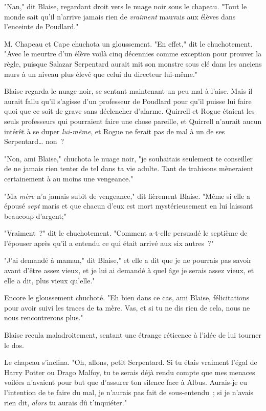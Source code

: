 "Nan," dit Blaise, regardant droit vers le nuage noir sous le chapeau. "Tout le monde sait qu'il n'arrive jamais rien de \emph{vraiment} mauvais aux élèves dans l'enceinte de Poudlard."

M. Chapeau et Cape chuchota un gloussement. "En effet," dit le chuchotement. "Avec le meurtre d'un élève voilà cinq décennies comme exception pour prouver la règle, puisque Salazar Serpentard aurait mit son monstre sous clé dans les anciens murs à un niveau plus élevé que celui du directeur lui-même."

Blaise regarda le nuage noir, se sentant maintenant un peu mal à l'aise. Mais il aurait fallu qu'il s'agisse d'un professeur de Poudlard pour qu'il puisse lui faire quoi que ce soit de grave sans déclencher d'alarme. Quirrell et Rogue étaient les seuls professeurs qui pourraient faire une chose pareille, et Quirrell n'aurait aucun intérêt à se duper \emph{lui-même}, et Rogue ne ferait pas de mal à un de ses Serpentard… non~?

"Non, ami Blaise," chuchota le nuage noir, "je souhaitais seulement te conseiller de ne jamais rien tenter de tel dans ta vie adulte. Tant de trahisons mèneraient certainement à au moins une vengeance."

"Ma \emph{mère} n'a jamais subit de vengeance," dit fièrement Blaise. "Même si elle a épousé \emph{sept} maris et que chacun d'eux est mort mystérieusement en lui laissant beaucoup d'argent;"

"Vraiment~?" dit le chuchotement. "Comment a-t-elle persuadé le septième de l'épouser après qu'il a entendu ce qui était arrivé aux six autres~?"

"J'ai demandé à maman," dit Blaise," et elle a dit que je ne pourrais pas savoir avant d'être assez vieux, et je lui ai demandé à quel âge je serais assez vieux, et elle a dit, plus vieux qu'elle."

Encore le gloussement chuchoté. "Eh bien dans ce cas, ami Blaise, félicitations pour avoir suivi les traces de ta mère. Vas, et si tu ne dis rien de cela, nous ne nous rencontrerons plus."

Blaise recula maladroitement, sentant une étrange réticence à l'idée de lui tourner le dos.

Le chapeau s'inclina. "Oh, allons, petit Serpentard. Si tu étais vraiment l'égal de Harry Potter ou Drago Malfoy, tu te serais déjà rendu compte que mes menaces voilées n'avaient pour but que d'assurer ton silence face à Albus. Aurais-je eu l'intention de te faire du mal, je n'aurais pas fait de sous-entendu~; si je n'avais rien dit, \emph{alors} tu aurais dû t'inquiéter."

